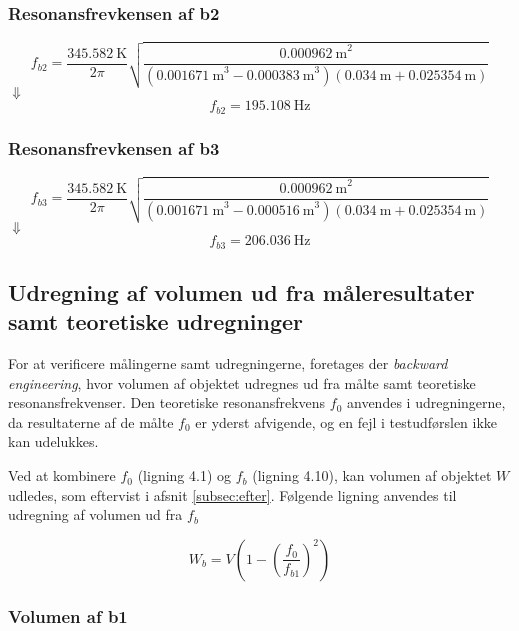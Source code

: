 \subsubsection{Resonansfrevkensen af b2} 
\begin{equation}
		f_{b2} = \frac{{\SI{345,582}{\kelvin}}}{2\pi}\sqrt{\frac{{\SI{0,000962}{\meter}^2}}{({\SI{0,001671}{\meter}^3}-{\SI{0,000383}{\meter}^3})({\SI{0,034}{\meter}}+ {\SI{0.025354}{\meter}})}}	
\end{equation}
$\Downarrow$
\begin{equation}
		f_{b2} = {\SI{195,108}{\hertz}}
\end{equation}

\subsubsection{Resonansfrevkensen af b3} 
\begin{equation}
		f_{b3} = \frac{{\SI{345,582}{\kelvin}}}{2\pi}\sqrt{\frac{{\SI{0,000962}{\meter}^2}}{({\SI{0,001671}{\meter}^3}-{\SI{0,000516}{\meter}^3})({\SI{0,034}{\meter}}+ {\SI{0.025354}{\meter}})}}	
\end{equation}
$\Downarrow$
\begin{equation}
		f_{b3} = {\SI{206,036}{\hertz}}
\end{equation}

\subsection{Udregning af volumen ud fra måleresultater samt teoretiske udregninger}

For at verificere målingerne samt udregningerne, foretages der \textit{backward engineering}, hvor volumen af objektet udregnes ud fra målte samt teoretiske resonansfrekvenser. Den teoretiske resonansfrekvens $f_{0}$ anvendes i udregningerne, da resultaterne af de målte $f_{0}$ er yderst afvigende, og en fejl i testudførslen ikke kan udelukkes.    

Ved at kombinere $f_{0}$ (ligning 4.1) og $f_{b}$ (ligning 4.10), kan volumen af objektet $W$ udledes, som eftervist i afsnit \ref{subsec:efter}. Følgende ligning anvendes til udregning af volumen ud fra $f_{b}$

\begin{equation}
		W_{b} = V\left(1-\left(\frac{f_{0}}{f_{b1}}\right)^2\right)
\end{equation}
 

\subsubsection{Volumen af b1}

